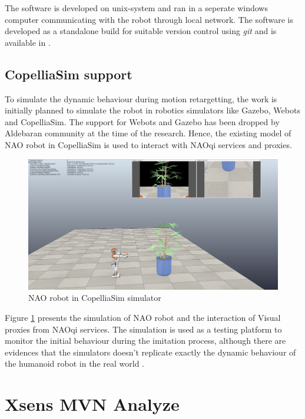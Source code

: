The software is developed on unix-system and ran in a seperate windows computer communicating with the robot through local network. The software is developed as a standalone build for suitable version control using \textit{git} and is available in 
\cite{github}.

\subsection{CopelliaSim support}
To simulate the dynamic behaviour during motion retargetting, the work is initially planned to simulate the robot in robotics simulators like Gazebo, Webots and CopelliaSim. 
The support for Webots and Gazebo has been dropped by Aldebaran community at the time of the research. Hence, the existing model of NAO robot in CopelliaSim is used to interact 
with NAOqi services and proxies. 


\begin{figure}[h!]
    \centering
    \includegraphics[scale=0.235]{images/copellia-sim.png}\hfill
    \caption{NAO robot in CopelliaSim simulator}\hfill
    \label{fig: copellia-sim}
\end{figure}

Figure \ref{fig: copellia-sim} presents the simulation of NAO robot and the interaction of Visual proxies from NAOqi services. The simulation is 
used as a testing platform to monitor the initial behaviour during the imitation process, although there are evidences that the simulators doesn't replicate exactly the dynamic 
behaviour of the humanoid robot in the real world \cite{ramosponce}. 

\section{Xsens MVN Analyze}

